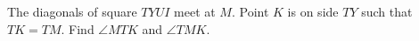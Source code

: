 The diagonals of square $TYUI$ meet at $M$. Point $K$ is on side $TY$ such that $TK=TM$. Find $\angle MTK$ and $\angle TMK$.

